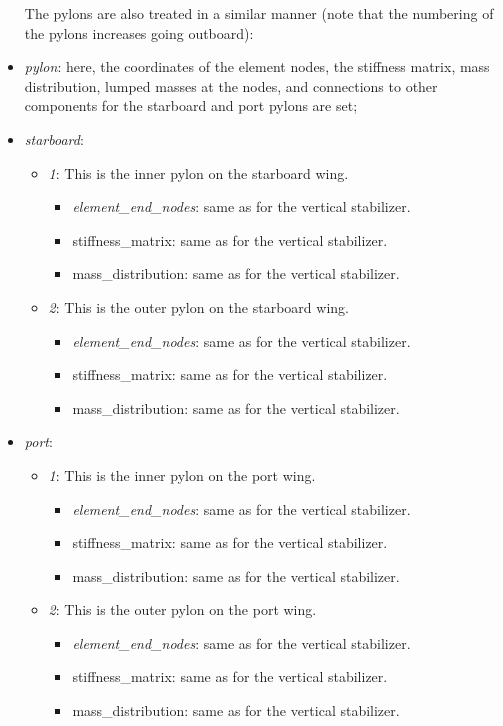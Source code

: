 \documentclass[report]{nrel}
\begin{document}
\begin{itemize}
The pylons are also treated in a similar manner (note that the numbering of the pylons increases going outboard):
	\item \emph{pylon}: here, the coordinates of the element nodes, the stiffness matrix, mass distribution, lumped masses at the nodes, and connections to other components for the starboard and port pylons are set; 
		\item \emph{starboard}:
		\begin{itemize}
			\item \emph{1}:	This is the inner pylon on the starboard wing.
			\begin{itemize}
				\item \emph{element\_end\_nodes}: same as for the vertical stabilizer.
				\item {stiffness\_matrix}: same as for the vertical stabilizer.
				\item {mass\_distribution}: same as for the vertical stabilizer.
			\end{itemize}
			\item \emph{2}:	This is the outer pylon on the starboard wing.
			\begin{itemize}
				\item \emph{element\_end\_nodes}: same as for the vertical stabilizer.
				\item {stiffness\_matrix}: same as for the vertical stabilizer.
				\item {mass\_distribution}: same as for the vertical stabilizer.
			\end{itemize}
		\end{itemize}
		\item \emph{port}:
		\begin{itemize}
			\item \emph{1}:	This is the inner pylon on the port wing.
			\begin{itemize}
				\item \emph{element\_end\_nodes}: same as for the vertical stabilizer.
				\item {stiffness\_matrix}: same as for the vertical stabilizer.
				\item {mass\_distribution}: same as for the vertical stabilizer.
			\end{itemize}
			\item \emph{2}:	This is the outer pylon on the port wing.
			\begin{itemize}
				\item \emph{element\_end\_nodes}: same as for the vertical stabilizer.
				\item {stiffness\_matrix}: same as for the vertical stabilizer.
				\item {mass\_distribution}: same as for the vertical stabilizer.
			\end{itemize}
		\end{itemize}


\end{itemize}
\end{document}
